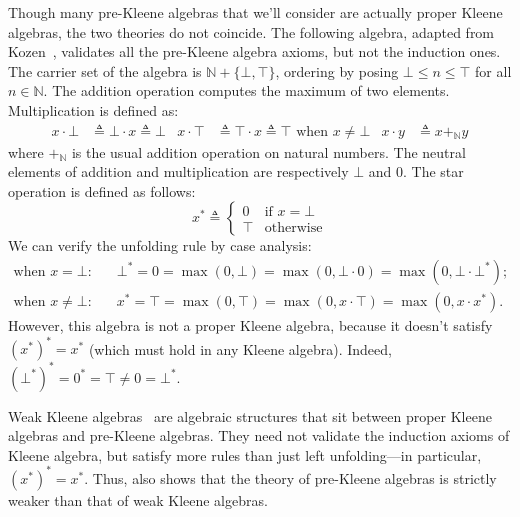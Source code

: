 \documentclass[a4paper,UKenglish,cleveref, autoref, thm-restate]{lipics-v2021}
\begin{document}
\begin{example}\label{exp:preKA-that-is-not-a-WKA}
  Though many pre-Kleene algebras that we'll consider are actually proper Kleene
  algebras, the two theories do not coincide.  The following algebra, adapted
  from Kozen~\cite{kozen_KleeneAlgebrasClosed_1990}, validates all the
  pre-Kleene algebra axioms, but not the induction ones. The carrier set of the
  algebra is \(\mathbb{N} + \{\bot, \top\}\), ordering by posing
  \( \bot \leq n \leq \top \) for all \(n \in \mathbb{N}\).  The addition
  operation computes the maximum of two elements. Multiplication is defined as:
  \begin{align*}
    x \cdot  \bot  & \triangleq  \bot  \cdot x \triangleq  \bot  &
    x \cdot  \top  & \triangleq  \top  \cdot x \triangleq  \top  \text{ when } x \neq \bot &
    x \cdot y & \triangleq x +_{\mathbb{N}} y
  \end{align*}
  where \(+_{\mathbb{N}}\) is the usual addition operation on natural numbers.
  The neutral elements of addition and multiplication are respectively $\bot$ and \(0\).  
  The star operation is defined as follows:
  \[x^* \triangleq
    \begin{cases}
      0 & \text{if } x = \bot \\
      \top & \text{otherwise}
    \end{cases}
  \]
  We can verify the unfolding rule by case analysis:
  \begin{align*}
    \text{when \(x = \bot\):}
    \quad&
           \bot^*
           = 0
           = \max(0, \bot)
           = \max(0, \bot \cdot 0)
           = \max(0, \bot \cdot \bot^*);\\
    \text{when \(x \neq \bot\):}
    \quad&
           x^*
           = \top
           = \max(0, \top)
           = \max(0, x \cdot \top)
           = \max(0, x \cdot x^*).
  \end{align*}
  However, this algebra is not a proper Kleene algebra, because it doesn't
  satisfy \((x^*)^* = x^*\) (which must hold in any Kleene algebra). Indeed,
  \((\bot^*)^* = 0^* = \top \neq 0 = \bot^*.\)
\end{example}

\begin{remark}
  Weak Kleene algebras~\cite{kozen_LefthandedCompleteness_2020} are algebraic
  structures that sit between proper Kleene algebras and pre-Kleene algebras.
  They need not validate the induction axioms of Kleene algebra, but satisfy
  more rules than just left unfolding---in particular, $(x^*)^* = x^*$.  Thus,
   also shows that the theory of pre-Kleene
  algebras is strictly weaker than that of weak Kleene algebras.
\end{remark}
\end{document}
